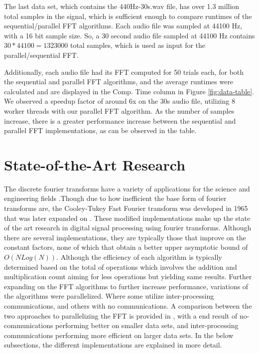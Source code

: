 \documentclass[journal]{IEEEtran}
\begin{document}
	\vspace{1em}
	\par{
		The last data set, which contains the 440Hz-30s.wav file, has over
		1.3 million total samples in the signal, which is sufficient enough
		to compare runtimes of the sequential/parallel FFT algorithms. Each
		audio file was sampled at 44100 Hz, with a 16 bit sample size. So, a 30
		second audio file sampled at 44100 Hz contains $30 * 44100 = 1323000$
		total samples, which is used as input for the parallel/sequential FFT.
	}
	\par{
		Additionally, each audio file had its FFT computed for 50 trials each, 
		for both the sequential and parallel FFT algorithms, and the 
		average runtimes were calculated and are displayed in the Comp. Time 
		column in Figure \ref{fig:data-table}. We observed a speedup factor of 
		around 6x on the 30s audio file, utilizing 8 worker threads with our 
		parallel FFT algorithm. As the number of samples increase, 
		there is a greater performance increase between the sequential and 
		parallel FFT implementations, as can be observed in the table.
	}

\section{State-of-the-Art Research}


	\par {
		The discrete fourier transforms have a variety of applications for the 
		science and engineering fields \cite{Xiang}.Though due to how inefficient 
		the base form of fourier transforms are, the Cooley-Tukey Fast Fourier transform 
		was developed in 1965 that was later expanded on \cite{CTA}. These modified implementations 
		make up the state of the art research in digital signal processing using fourier transforms. 
		Although there are several implementations, they are typically those that improve on the constant 
		factors, none of which that obtain a better upper asymptotic bound of ${O(N Log(N))}$. Although 
		the efficiency of each algorithm is typically determined based on the total of operations which 
		involves the addition and multiplication count aiming for less operations but yielding same results. 
		Further expanding on the FFT algorithms to further increase performance, variations of the algorithms 
		were parallelized. Where some utilize inter-processing communications, and others with no communications. 
		A comparison between the two approaches to parallelizing the FFT is provided in \cite{Pan}, with a 
		end result of no-communications performing better on smaller data sets, and inter-processing communications 
		performing more efficient on larger data sets. In the below subsections, the different implementations 
		are explained in more detail.
	}
\end{document}
